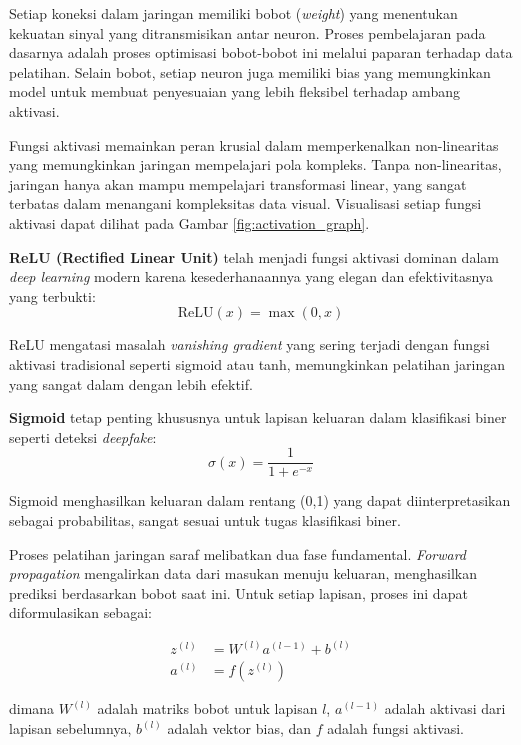 Setiap koneksi dalam jaringan memiliki bobot (\textit{weight}) yang menentukan kekuatan sinyal yang ditransmisikan antar neuron. Proses pembelajaran pada dasarnya adalah proses optimisasi bobot-bobot ini melalui paparan terhadap data pelatihan. Selain bobot, setiap neuron juga memiliki bias yang memungkinkan model untuk membuat penyesuaian yang lebih fleksibel terhadap ambang aktivasi.

Fungsi aktivasi memainkan peran krusial dalam memperkenalkan non-linearitas yang memungkinkan jaringan mempelajari pola kompleks. Tanpa non-linearitas, jaringan hanya akan mampu mempelajari transformasi linear, yang sangat terbatas dalam menangani kompleksitas data visual. Visualisasi setiap fungsi aktivasi dapat dilihat pada Gambar \ref{fig:activation_graph}.

\textbf{ReLU (Rectified Linear Unit)} telah menjadi fungsi aktivasi dominan dalam \textit{deep learning} modern karena kesederhanaannya yang elegan dan efektivitasnya yang terbukti:
\begin{equation}
\text{ReLU}(x) = \max(0, x)
\label{eq:relu}
\end{equation}

ReLU mengatasi masalah \textit{vanishing gradient} yang sering terjadi dengan fungsi aktivasi tradisional seperti sigmoid atau tanh, memungkinkan pelatihan jaringan yang sangat dalam dengan lebih efektif.

\textbf{Sigmoid} tetap penting khususnya untuk lapisan keluaran dalam klasifikasi biner seperti deteksi \textit{deepfake}:
\begin{equation}
\sigma(x) = \frac{1}{1 + e^{-x}}
\label{eq:sigmoid}
\end{equation}

Sigmoid menghasilkan keluaran dalam rentang (0,1) yang dapat diinterpretasikan sebagai probabilitas, sangat sesuai untuk tugas klasifikasi biner. 

Proses pelatihan jaringan saraf melibatkan dua fase fundamental. \textit{Forward propagation} mengalirkan data dari masukan menuju keluaran, menghasilkan prediksi berdasarkan bobot saat ini. Untuk setiap lapisan, proses ini dapat diformulasikan sebagai:

\begin{align}
z^{(l)} &= W^{(l)} a^{(l-1)} + b^{(l)} \label{eq:forward_z} \\
a^{(l)} &= f(z^{(l)}) \label{eq:forward_a}
\end{align}

dimana $W^{(l)}$ adalah matriks bobot untuk lapisan $l$, $a^{(l-1)}$ adalah aktivasi dari lapisan sebelumnya, $b^{(l)}$ adalah vektor bias, dan $f$ adalah fungsi aktivasi.

